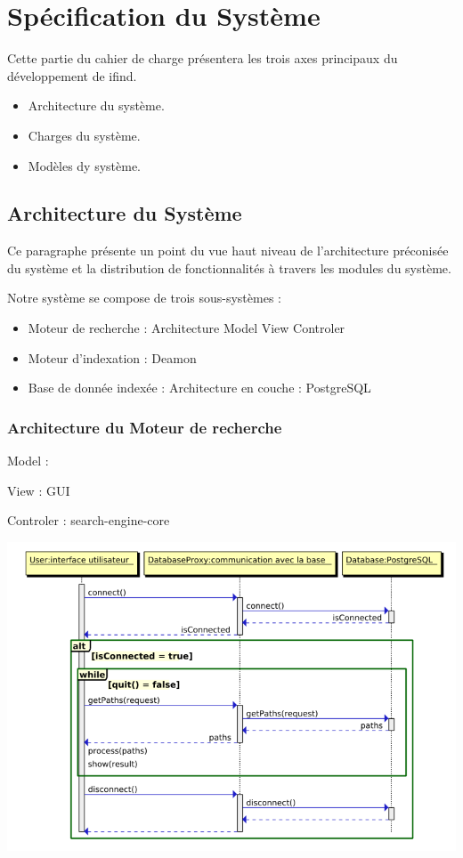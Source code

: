 \section{Spécification du Système}
Cette partie du cahier de charge présentera les trois axes principaux du développement de ifind.
\begin{itemize}
 \item Architecture du système.
 \item Charges du système.
 \item Modèles dy système.
\end{itemize}

\subsection{Architecture du Système}
Ce paragraphe présente un point du vue haut niveau de l'architecture préconisée du système et la distribution de fonctionnalités à travers 
les modules du système.

Notre système se compose de trois sous-systèmes :
\begin{itemize}
 \item Moteur de recherche : Architecture Model View Controler
 \item Moteur d'indexation : Deamon
 \item Base de donnée indexée : Architecture en couche : PostgreSQL
\end{itemize}

\subsubsection{Architecture du Moteur de recherche}


Model :

View : GUI

Controler : search-engine-core
\begin{center}
\includegraphics[scale=0.5]{seqmrbi.png}
\end{center}


